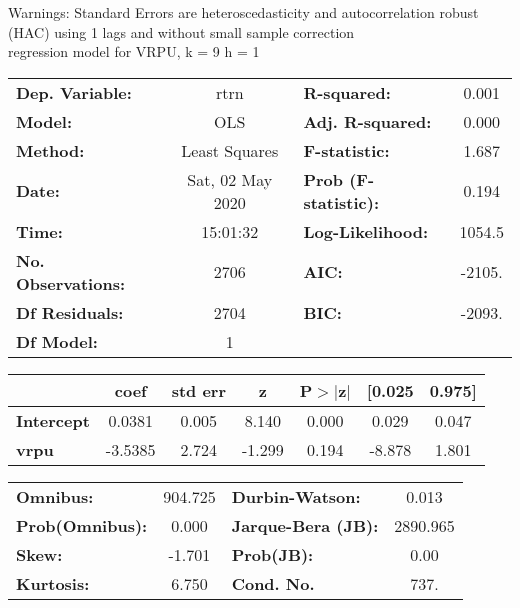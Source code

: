 Warnings: \newline
 [1] Standard Errors are heteroscedasticity and autocorrelation robust (HAC) using 1 lags and without small sample correction\\ 

regression model for VRPU, k = 9 h = 1\begin{center}
\begin{tabular}{lclc}
\toprule
\textbf{Dep. Variable:}    &       rtrn       & \textbf{  R-squared:         } &     0.001   \\
\textbf{Model:}            &       OLS        & \textbf{  Adj. R-squared:    } &     0.000   \\
\textbf{Method:}           &  Least Squares   & \textbf{  F-statistic:       } &     1.687   \\
\textbf{Date:}             & Sat, 02 May 2020 & \textbf{  Prob (F-statistic):} &    0.194    \\
\textbf{Time:}             &     15:01:32     & \textbf{  Log-Likelihood:    } &    1054.5   \\
\textbf{No. Observations:} &        2706      & \textbf{  AIC:               } &    -2105.   \\
\textbf{Df Residuals:}     &        2704      & \textbf{  BIC:               } &    -2093.   \\
\textbf{Df Model:}         &           1      & \textbf{                     } &             \\
\bottomrule
\end{tabular}
\begin{tabular}{lcccccc}
                   & \textbf{coef} & \textbf{std err} & \textbf{z} & \textbf{P$> |$z$|$} & \textbf{[0.025} & \textbf{0.975]}  \\
\midrule
\textbf{Intercept} &       0.0381  &        0.005     &     8.140  &         0.000        &        0.029    &        0.047     \\
\textbf{vrpu}      &      -3.5385  &        2.724     &    -1.299  &         0.194        &       -8.878    &        1.801     \\
\bottomrule
\end{tabular}
\begin{tabular}{lclc}
\textbf{Omnibus:}       & 904.725 & \textbf{  Durbin-Watson:     } &    0.013  \\
\textbf{Prob(Omnibus):} &   0.000 & \textbf{  Jarque-Bera (JB):  } & 2890.965  \\
\textbf{Skew:}          &  -1.701 & \textbf{  Prob(JB):          } &     0.00  \\
\textbf{Kurtosis:}      &   6.750 & \textbf{  Cond. No.          } &     737.  \\
\bottomrule
\end{tabular}
\end{center}

